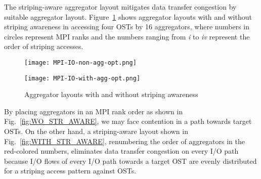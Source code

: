 \documentclass{jhps}
\begin{document}
The striping-aware aggregator layout mitigates data transfer congestion
by suitable aggregator layout.
Figure~\ref{fig:AGG_STR_AWARE} shows aggregator layouts with and
without striping awareness in accessing four OSTs by 16 aggregators,
where numbers in circles represent MPI ranks
and the numbers ranging from {\itshape i} to {\itshape iv} represent
the order of striping accesses.
%
\begin{figure}[tb]
\centering
\begin{minipage}[t]{0.42\textwidth}
\centering
\texttt{[image: MPI-IO-non-agg-opt.png]}
\label{fig:WO_STR_AWARE}
\end{minipage}
\noindent
\begin{minipage}[t]{0.42\textwidth}
\centering
\texttt{[image: MPI-IO-with-agg-opt.png]}
\label{fig:WITH_STR_AWARE}
\end{minipage}
\caption{Aggregator layouts with and without striping awareness}
\label{fig:AGG_STR_AWARE}
\end{figure}
%
By placing aggregators in an MPI rank order
as shown in Fig.~\ref{fig:WO_STR_AWARE},
we may face contention in a path towards target OSTs.
On the other hand, a striping-aware layout shown in
Fig.~\ref{fig:WITH_STR_AWARE},
renumbering the order of aggregators in the red-colored numbers,
eliminates data transfer congestion on every I/O path
because I/O flows of every I/O path towards a target OST are
evenly distributed for a striping access pattern against OSTs.
\end{document}
